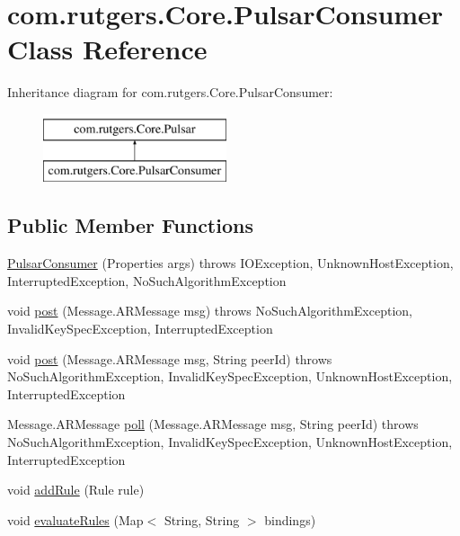 \hypertarget{classcom_1_1rutgers_1_1Core_1_1PulsarConsumer}{}\section{com.\+rutgers.\+Core.\+Pulsar\+Consumer Class Reference}
\label{classcom_1_1rutgers_1_1Core_1_1PulsarConsumer}
Inheritance diagram for com.\+rutgers.\+Core.\+Pulsar\+Consumer\+:\begin{figure}[H]
\begin{center}
\leavevmode
\includegraphics[height=2.000000cm]{classcom_1_1rutgers_1_1Core_1_1PulsarConsumer}
\end{center}
\end{figure}
\subsection*{Public Member Functions}
\begin{DoxyCompactItemize}
\item 
\hyperlink{classcom_1_1rutgers_1_1Core_1_1PulsarConsumer_a8363b02cc59fd0f135b0cbe46ee66715}{Pulsar\+Consumer} (Properties args)  throws I\+O\+Exception, Unknown\+Host\+Exception, Interrupted\+Exception, No\+Such\+Algorithm\+Exception 
\item 
void \hyperlink{classcom_1_1rutgers_1_1Core_1_1PulsarConsumer_ad2013ec340467446030558208403897d}{post} (Message.\+A\+R\+Message msg)  throws No\+Such\+Algorithm\+Exception, Invalid\+Key\+Spec\+Exception, Interrupted\+Exception 
\item 
void \hyperlink{classcom_1_1rutgers_1_1Core_1_1PulsarConsumer_a0e623fb8e161e9f0d920fee65a848f6d}{post} (Message.\+A\+R\+Message msg, String peer\+Id)  throws No\+Such\+Algorithm\+Exception, Invalid\+Key\+Spec\+Exception, Unknown\+Host\+Exception, Interrupted\+Exception 
\item 
Message.\+A\+R\+Message \hyperlink{classcom_1_1rutgers_1_1Core_1_1PulsarConsumer_af71ea9ed92b65eda41f352ccaa659989}{poll} (Message.\+A\+R\+Message msg, String peer\+Id)  throws No\+Such\+Algorithm\+Exception, Invalid\+Key\+Spec\+Exception, Unknown\+Host\+Exception, Interrupted\+Exception 
\item 
void \hyperlink{classcom_1_1rutgers_1_1Core_1_1PulsarConsumer_a19896243be98750670fb8688f035c2f4}{add\+Rule} (Rule rule)
\item 
void \hyperlink{classcom_1_1rutgers_1_1Core_1_1PulsarConsumer_aa90fbf7fb791809026d7536c7a6406bf}{evaluate\+Rules} (Map$<$ String, String $>$ bindings)
\end{DoxyCompactItemize}



